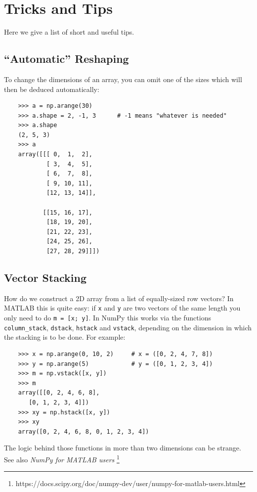 \documentclass[UTF8]{article}
\begin{document}
\section{Tricks and Tips}
Here we give a list of short and useful tips.

\subsection{``Automatic'' Reshaping}
To change the dimensions of an array, you can omit one of the sizes which will then be deduced
automatically:
\begin{verbatim}
    >>> a = np.arange(30)
    >>> a.shape = 2, -1, 3      # -1 means "whatever is needed"
    >>> a.shape
    (2, 5, 3)
    >>> a
    array([[[ 0,  1,  2],
            [ 3,  4,  5],
            [ 6,  7,  8],
            [ 9, 10, 11],
            [12, 13, 14]],

           [[15, 16, 17],
            [18, 19, 20],
            [21, 22, 23],
            [24, 25, 26],
            [27, 28, 29]]])
\end{verbatim}

\subsection{Vector Stacking}
How do we construct a 2D array from a list of equally-sized row vectors? In MATLAB this is quite
easy: if \texttt{x} and \texttt{y} are two vectors of the same length you only need to do
\texttt{m = [x; y]}. In NumPy this works via the functions \texttt{column\_stack}, \texttt{dstack},
\texttt{hstack} and \texttt{vstack}, depending on the dimension in which the stacking is to be
done. For example:
\begin{verbatim}
    >>> x = np.arange(0, 10, 2)     # x = ([0, 2, 4, 7, 8])
    >>> y = np.arange(5)            # y = ([0, 1, 2, 3, 4])
    >>> m = np.vstack([x, y])
    >>> m
    array([[0, 2, 4, 6, 8],
       [0, 1, 2, 3, 4]])
    >>> xy = np.hstack([x, y])
    >>> xy
    array([0, 2, 4, 6, 8, 0, 1, 2, 3, 4])
\end{verbatim}

The logic behind those functions in more than two dimensions can be strange. See also \emph{NumPy
for MATLAB users} \footnote{https://docs.scipy.org/doc/numpy-dev/user/numpy-for-matlab-users.html}
\end{document}
